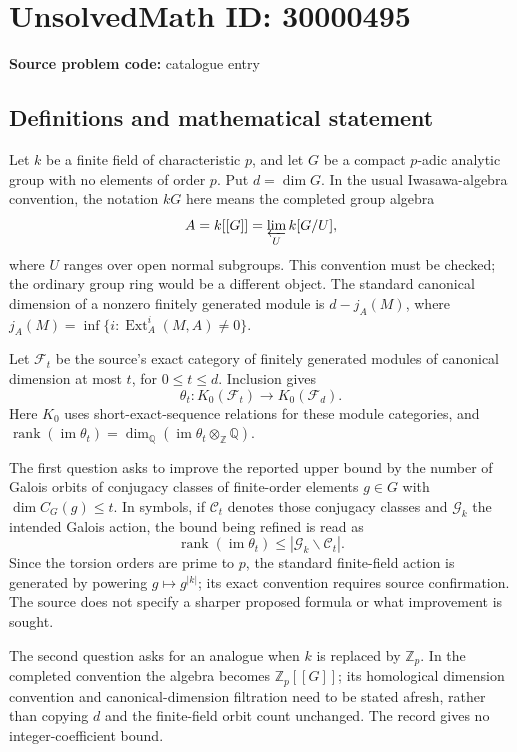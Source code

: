 \documentclass[11pt]{article}
\newcommand{\Z}{\mathbb{Z}}
\newcommand{\Q}{\mathbb{Q}}
\begin{document}
\section*{UnsolvedMath ID: 30000495}
\textbf{Source problem code:} catalogue entry
\subsection{Definitions and mathematical statement}
Let \(k\) be a finite field of characteristic \(p\), and let \(G\) be a compact \(p\)-adic analytic group with no elements of order \(p\). Put \(d=\dim G\). In the usual Iwasawa-algebra convention, the notation \(kG\) here means the completed group algebra
\[
A=k[[G]]=\varprojlim_U k[G/U],
\]
where \(U\) ranges over open normal subgroups. This convention must be checked; the ordinary group ring would be a different object. The standard canonical dimension of a nonzero finitely generated module is \(d-j_A(M)\), where \(j_A(M)=\inf\{i:\operatorname{Ext}_A^i(M,A)\ne0\}\).

Let \(\mathcal F_t\) be the source's exact category of finitely generated modules of canonical dimension at most \(t\), for \(0\leq t\leq d\). Inclusion gives
\[
\theta_t:K_0(\mathcal F_t)\longrightarrow K_0(\mathcal F_d).
\]
Here \(K_0\) uses short-exact-sequence relations for these module categories, and
\(\operatorname{rank}(\operatorname{im}\theta_t)=\dim_\Q(\operatorname{im}\theta_t\otimes_\Z\Q)\).

The first question asks to improve the reported upper bound by the number of Galois orbits of conjugacy classes of finite-order elements \(g\in G\) with \(\dim C_G(g)\leq t\). In symbols, if \(\mathcal C_t\) denotes those conjugacy classes and \(\mathscr G_k\) the intended Galois action, the bound being refined is read as
\[
\operatorname{rank}(\operatorname{im}\theta_t)\leq|\mathscr G_k\backslash\mathcal C_t|.
\]
Since the torsion orders are prime to \(p\), the standard finite-field action is generated by powering \(g\mapsto g^{|k|}\); its exact convention requires source confirmation. The source does not specify a sharper proposed formula or what improvement is sought.

The second question asks for an analogue when \(k\) is replaced by \(\Z_p\). In the completed convention the algebra becomes \(\Z_p[[G]]\); its homological dimension convention and canonical-dimension filtration need to be stated afresh, rather than copying \(d\) and the finite-field orbit count unchanged. The record gives no integer-coefficient bound.
\end{document}
